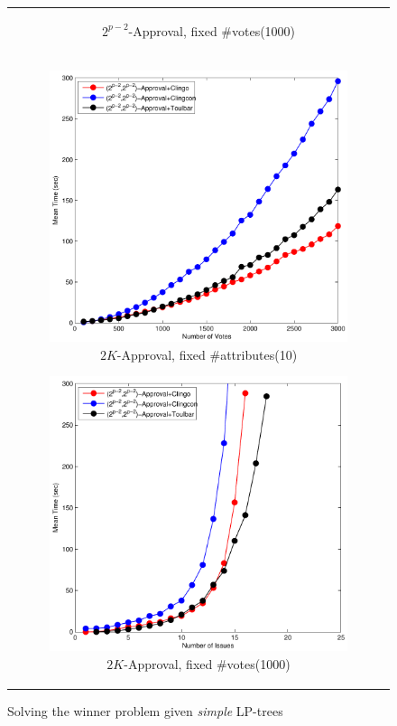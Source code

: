 \begin{figure}[ht!]
\begin{tabular}{c}
\begin{subfigure}[b]{0.44\textwidth}
    \caption{$2^{p-2}$-Approval, fixed \#votes(1000)}
		\label{fig:comparison:win:4}
	\end{subfigure}
  \\
  \begin{subfigure}[b]{0.44\textwidth}
		\includegraphics[width=\textwidth]{figs/2kAppFIMSCICP.pdf}
    \caption{$2K$-Approval, fixed \#attributes(10)}
		\label{fig:comparison:win:5}
	\end{subfigure}
  \begin{subfigure}[b]{0.44\textwidth}
		\includegraphics[width=\textwidth]{figs/2kAppFVMSCICP.pdf}
    \caption{$2K$-Approval, fixed \#votes(1000)}
		\label{fig:comparison:win:6}
	\end{subfigure}
	\end{tabular}
  \caption{Solving the winner problem given \textit{simple} LP-trees}
  \label{fig:win}

\end{figure}


